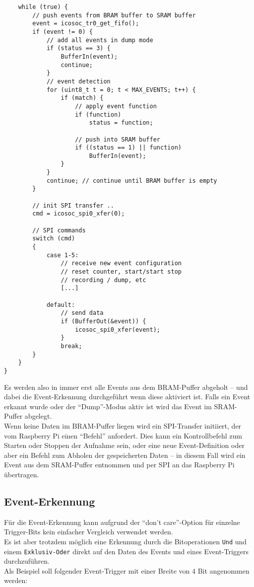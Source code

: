 {\begin{verbatim}
	while (true) {
		// push events from BRAM buffer to SRAM buffer 
		event = icosoc_tr0_get_fifo();
		if (event != 0) {
			// add all events in dump mode
			if (status == 3) {
				BufferIn(event);	
				continue;
			}
			// event detection
			for (uint8_t t = 0; t < MAX_EVENTS; t++) {
				if (match) {
					// apply event function
					if (function)
						status = function;
					
					// push into SRAM buffer
					if ((status == 1) || function)
						BufferIn(event);
				}	
			}
			continue; // continue until BRAM buffer is empty	
		}

		// init SPI transfer ..
		cmd = icosoc_spi0_xfer(0);
	
		// SPI commands	
		switch (cmd) 
		{
			case 1-5:
				// receive new event configuration
				// reset counter, start/start stop 
				// recording / dump, etc
				[...]
		
			default:
				// send data
				if (BufferOut(&event)) {
					icosoc_spi0_xfer(event);
				}		
				break;
		}
	}
}
\end{verbatim}

Es werden also in immer erst alle Events aus dem BRAM-Puffer abgeholt -- und dabei die Event-Erkennung durchgeführt wenn diese aktiviert ist. Falls ein Event erkannt wurde oder der ``Dump''-Modus aktiv ist wird das Event im SRAM-Puffer abgelegt.\\
Wenn keine Daten im BRAM-Puffer liegen wird ein SPI-Transfer initiiert, der vom Raspberry Pi einen ``Befehl'' anfordert. Dies kann ein Kontrollbefehl zum Starten oder Stoppen der Aufnahme sein, oder eine neue Event-Definition oder aber ein Befehl zum Abholen der gespeicherten Daten -- in diesem Fall wird ein Event aus dem SRAM-Puffer entnommen und per SPI an das Raspberry Pi übertragen. 

\subsection{Event-Erkennung}

Für die Event-Erkennung kann aufgrund der ``don't care''-Option für einzelne Trigger-Bits kein einfacher Vergleich verwendet werden.\\
Es ist aber trotzdem möglich eine Erkennung durch die Bitoperationen {\tt Und} und einem {\tt Exklusiv-Oder} direkt auf den Daten des Events und eines Event-Triggers durchzuführen.\\
Als Beispiel soll folgender Event-Trigger mit einer Breite von 4 Bit angenommen werden:

}

